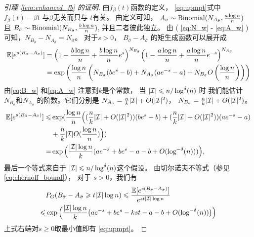 \begin{proof}[引理 \ref{lem:enhanced_fb} 的证明]
  由$f_{\beta}(t)$函数的定义，
  \eqref{eq:upmpt}式中
  $f_{\beta}(t) - \beta t$ 与$\beta$无关而只与
  $t$有关。
	由定义可知，
  $A_{\bar{\sigma}}\sim \operatorname{Binomial}(N_{A_{\bar{\sigma}}},\frac{a\log n}{n})$
  且
	$B_{\bar{\sigma}}\sim\operatorname{Binomial}(N_{B_{\bar{\sigma}}},\frac{b\log n}{n})$,
  并且二者彼此独立。
  由 ( \ref{eq:N_w} - \ref{eq:A_w} )可知，$N_{B_{\bar{\sigma}}} - N_{A_{\bar{\sigma}}}
  = N_{\bar{\sigma}}$。
  对于$s>0$，
  $B_{\bar{\sigma}}-A_{\bar{\sigma}}$ 的矩生成函数可以展开成
	\begin{align}
	 \mathbb{E}[e^{s(B_{\bar{\sigma}}-A_{\bar{\sigma}})}] 
	& =\Big(1-\frac{b\log n}{n}+\frac{b\log n}{n} e^s \Big)^{N_{B_{\bar{\sigma}}}}
	\Big(1-\frac{a\log n}{n}+\frac{a\log n}{n} e^{-s} \Big)^{N_{A_{\bar{\sigma}}}}  \notag\\
	& = \exp\left(\frac{\log n}{n}\left(N_{B_{\bar{\sigma}}}
  (be^s - b) + N_{A_{\bar{\sigma}}}(ae^{-s}-a) + N_{B_{\bar{\sigma}}}
  O \left(\frac{\log n}{n} \right) \right) \right)
  \label{eq:exp_s_B_A_sigma}
	\end{align}
	由\eqref{eq:B_w}
  和\eqref{eq:A_w}
  注意到$k$是个常数，
  当
  $|\mathcal{I}| \leqslant n/\log^{\delta}(n)$ 时
	我们能估计
  $N_{B_{\bar{\sigma}}}$和$N_{A_{\bar{\sigma}}}$
  的阶数。它们分别是
  $N_{A_{\bar{\sigma}}} = \frac{n}{k}|\mathcal{I}| + O(|\mathcal{I}|^2)$，
	 $N_{B_{\bar{\sigma}}} = \frac{n}{k}|\mathcal{I}| + O(|\mathcal{I}|^2)$。
	\begin{align*}
	\mathbb{E}[e^{s(B_{\bar{\sigma}}-A_{\bar{\sigma}})}]
   \leqslant&
	\exp(\frac{\log n}{n}\Big((\frac{n}{k}|\mathcal{I}| + O(|\mathcal{I}|^2))(be^s - b) +(\frac{n}{k} |\mathcal{I}| + O(|\mathcal{I}|^2))(ae^{-s}-a) \\
  &+ \frac{n}{k}|\mathcal{I}|O(\frac{\log n}{n}) \Big))\\
	=
  & \exp\Big(\frac{|\mathcal{I}| \log n}{k}(a e^{-s}+b e^s-a-b +
	O(\log^{-\delta}(n))) \Big),
	\end{align*}
	最后一个等式来自于
  $ |\mathcal{I}| \leqslant n/\log^{\delta}(n)$这个假设。
	由切尔诺夫不等式（参见 \eqref{eq:chernoff_bound}），
  对于 $s>0$，我们有
	\begin{align*} 
	& P_G(B_{\bar{\sigma}}-A_{\bar{\sigma}}\geqslant t |\mathcal{I}| \log n)\leqslant
	\frac{\mathbb{E}[e^{s(B_{\bar{\sigma}}-A_{\bar{\sigma}})}]}{e^{st |\mathcal{I}|  \log n}}  \\
	\leqslant & \exp\Big(\frac{|\mathcal{I}|\log n}{k} \big(a e^{-s}+b e^s -kst -a-b
	+ O(\log^{-\delta}(n)) \big)\Big) 
	\end{align*}
	上式右端对$s\geq 0$取最小值即有
  \eqref{eq:upmpt}。  
	\end{proof}

